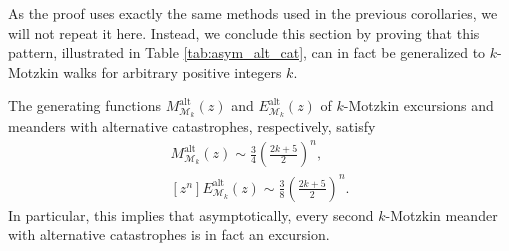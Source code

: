 As the proof uses exactly the same methods used in the previous corollaries, we will not repeat it here. Instead, we conclude this section by proving that this pattern, illustrated in Table \ref{tab:asym_alt_cat}, can in fact be generalized to $k$-Motzkin walks for arbitrary positive integers $k$.


\begin{theorem} \label{thm:asym_k_motzkin}
  The generating functions $M_{\mathcal{M}_k}^\mathrm{alt}(z)$ and $E_{\mathcal{M}_k}^\mathrm{alt}(z)$ of $k$-Motzkin excursions and meanders with alternative catastrophes, respectively, satisfy
  \begin{align*}
    [z^n]M_{\mathcal{M}_k}^\mathrm{alt}(z) \sim \frac{3}{4} \left(\frac{2k+5}{2}\right)^{n}, \\
    [z^n]E_{\mathcal{M}_k}^\mathrm{alt}(z) \sim \frac{3}{8} \left(\frac{2k+5}{2}\right)^{n}.
  \end{align*}
  In particular, this implies that asymptotically, every second $k$-Motzkin meander with alternative catastrophes is in fact an excursion.
\end{theorem}

